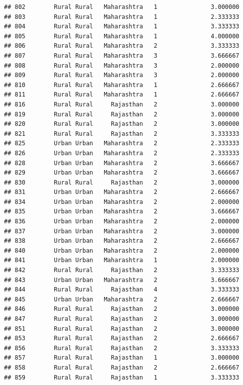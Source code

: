 \documentclass[
]{article}
\begin{document}
\begin{verbatim}
## 802        Rural Rural   Maharashtra   1               3.000000
## 803        Rural Rural   Maharashtra   1               2.333333
## 804        Rural Rural   Maharashtra   1               3.333333
## 805        Rural Rural   Maharashtra   1               4.000000
## 806        Rural Rural   Maharashtra   2               3.333333
## 807        Rural Rural   Maharashtra   3               3.666667
## 808        Rural Rural   Maharashtra   3               2.000000
## 809        Rural Rural   Maharashtra   3               2.000000
## 810        Rural Rural   Maharashtra   1               2.666667
## 811        Rural Rural   Maharashtra   1               2.666667
## 816        Rural Rural     Rajasthan   2               3.000000
## 819        Rural Rural     Rajasthan   2               3.000000
## 820        Rural Rural     Rajasthan   2               3.000000
## 821        Rural Rural     Rajasthan   2               3.333333
## 825        Urban Urban   Maharashtra   2               2.333333
## 826        Urban Urban   Maharashtra   2               2.333333
## 828        Urban Urban   Maharashtra   2               3.666667
## 829        Urban Urban   Maharashtra   2               3.666667
## 830        Rural Rural     Rajasthan   2               3.000000
## 831        Urban Urban   Maharashtra   2               2.666667
## 834        Urban Urban   Maharashtra   2               2.000000
## 835        Urban Urban   Maharashtra   2               3.666667
## 836        Urban Urban   Maharashtra   2               2.000000
## 837        Urban Urban   Maharashtra   2               3.000000
## 838        Urban Urban   Maharashtra   2               2.666667
## 840        Urban Urban   Maharashtra   2               2.000000
## 841        Urban Urban   Maharashtra   1               2.000000
## 842        Rural Rural     Rajasthan   2               3.333333
## 843        Urban Urban   Maharashtra   2               3.666667
## 844        Rural Rural     Rajasthan   4               3.333333
## 845        Urban Urban   Maharashtra   2               2.666667
## 846        Rural Rural     Rajasthan   2               3.000000
## 847        Rural Rural     Rajasthan   2               3.000000
## 851        Rural Rural     Rajasthan   2               3.000000
## 853        Rural Rural     Rajasthan   2               2.666667
## 856        Rural Rural     Rajasthan   2               3.333333
## 857        Rural Rural     Rajasthan   1               3.000000
## 858        Rural Rural     Rajasthan   2               2.666667
## 859        Rural Rural     Rajasthan   1               3.333333

\end{verbatim}
\end{document}
